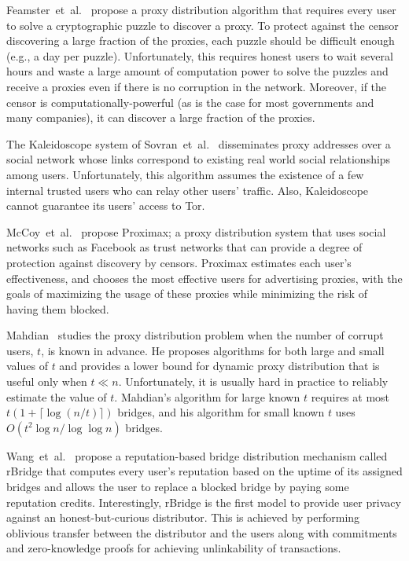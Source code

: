 \documentclass[letterpaper,twocolumn,10pt]{article}
\newcommand{\etal}{et~al.}
\newcommand{\eg}{e.g.}
\begin{document}
Feamster~\etal~\cite{Feamster:PETS:2003} propose a proxy distribution algorithm that requires every user to solve a cryptographic puzzle to discover a proxy. To protect against the censor discovering a large fraction of the proxies, each puzzle should be difficult enough (\eg, a day per puzzle). Unfortunately, this requires honest users to wait several hours and waste a large amount of computation power to solve the puzzles and receive a proxies even if there is no corruption in the network. Moreover, if the censor is computationally-powerful (as is the case for most governments and many companies), it can discover a large fraction of the proxies.

The Kaleidoscope system of Sovran~\etal~\cite{Sovran:2008:PSN} disseminates proxy addresses over a social network whose links correspond to existing real world social relationships among users. Unfortunately, this algorithm assumes the existence of a few internal trusted users who can relay other users' traffic. Also, Kaleidoscope cannot guarantee its users' access to Tor.

McCoy~\etal~\cite{McCoy:FC:2011} propose Proximax; a proxy distribution system that uses social networks such as Facebook as trust networks that can provide a degree of protection against discovery by censors. Proximax estimates each user's effectiveness, and chooses the most effective users for advertising proxies, with the goals of maximizing the usage of these proxies while minimizing the risk of having them blocked.

Mahdian~\cite{Mahdian:2010} studies the proxy distribution problem when the number of corrupt users, $t$, is known in advance. He proposes algorithms for both large and small values of $t$ and provides a lower bound for dynamic proxy distribution that is useful only when ${t \ll n}$.
Unfortunately, it is usually hard in practice to reliably estimate the value of $t$. Mahdian's algorithm for large known $t$ requires at most ${t\left(1 + \lceil \log{(n/t)} \rceil \right)}$ bridges, and his algorithm for small known $t$ uses ${O(t^2 \log{n} / \log{\log{n}})}$ bridges.

Wang~\etal~\cite{WangLBH:rBridge:13} propose a reputation-based bridge distribution mechanism called rBridge that computes every user's reputation based on the uptime of its assigned bridges and allows the user to replace a blocked bridge by paying some reputation credits. Interestingly, rBridge is the first model to provide user privacy against an honest-but-curious distributor. This is achieved by performing oblivious transfer between the distributor and the users along with commitments and zero-knowledge proofs for achieving unlinkability of transactions.
\end{document}
